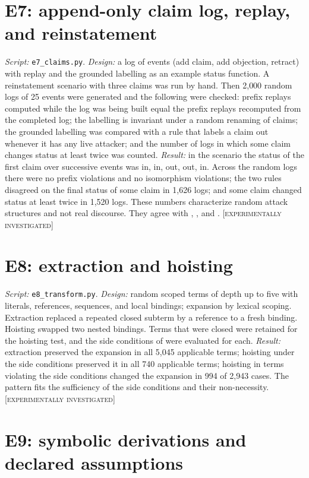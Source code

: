 \documentclass[11pt,twoside,openright]{book}
\theoremstyle{plain}
\theoremstyle{definition}
\theoremstyle{remark}
\newcommand{\Tested}{\textup{\textsc{[experimentally investigated]}}}
\begin{document}
\section{E7: append-only claim log, replay, and reinstatement}

\emph{Script:} \texttt{e7\_claims.py}. \emph{Design:} a log of events (add claim, add objection, retract) with replay and the grounded labelling as an example status function. A reinstatement scenario with three claims was run by hand. Then 2{,}000 random logs of 25 events were generated and the following were checked: prefix replays computed while the log was being built equal the prefix replays recomputed from the completed log; the labelling is invariant under a random renaming of claims; the grounded labelling was compared with a rule that labels a claim out whenever it has any live attacker; and the number of logs in which some claim changes status at least twice was counted. \emph{Result:} in the scenario the status of the first claim over successive events was in, in, out, out, in. Across the random logs there were no prefix violations and no isomorphism violations; the two rules disagreed on the final status of some claim in 1{,}626 logs; and some claim changed status at least twice in 1{,}520 logs. These numbers characterize random attack structures and not real discourse. They agree with , , and . \Tested{}

\section{E8: extraction and hoisting}

\emph{Script:} \texttt{e8\_transform.py}. \emph{Design:} random scoped terms of depth up to five with literals, references, sequences, and local bindings; expansion by lexical scoping. Extraction replaced a repeated closed subterm by a reference to a fresh binding. Hoisting swapped two nested bindings. Terms that were closed were retained for the hoisting test, and the side conditions of  were evaluated for each. \emph{Result:} extraction preserved the expansion in all 5{,}045 applicable terms; hoisting under the side conditions preserved it in all 740 applicable terms; hoisting in terms violating the side conditions changed the expansion in 994 of 2{,}943 cases. The pattern fits the sufficiency of the side conditions and their non-necessity. \Tested{}

\section{E9: symbolic derivations and declared assumptions}
\end{document}
